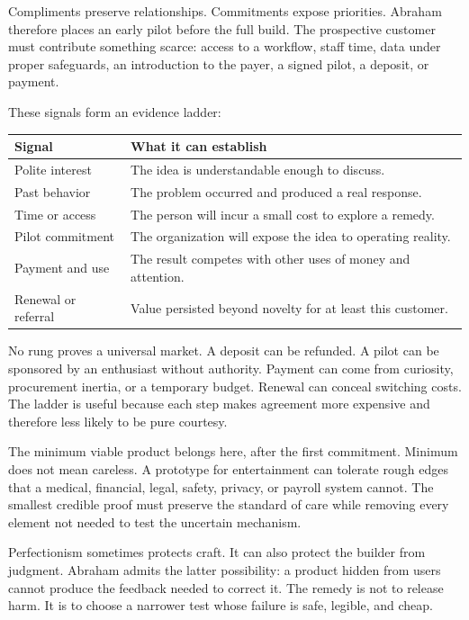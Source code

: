 Compliments preserve relationships. Commitments expose priorities. Abraham
therefore places an early pilot before the full build. The prospective customer
must contribute something scarce: access to a workflow, staff time, data under
proper safeguards, an introduction to the payer, a signed pilot, a deposit, or
payment.

These signals form an evidence ladder:

\begin{center}
\begin{tabular}{@{}p{}p{}@{}}
\toprule
\textbf{Signal} & \textbf{What it can establish} \\
\midrule
Polite interest & The idea is understandable enough to discuss. \\
Past behavior & The problem occurred and produced a real response. \\
Time or access & The person will incur a small cost to explore a remedy. \\
Pilot commitment & The organization will expose the idea to operating reality. \\
Payment and use & The result competes with other uses of money and attention. \\
Renewal or referral & Value persisted beyond novelty for at least this customer. \\
\bottomrule
\end{tabular}
\end{center}

No rung proves a universal market. A deposit can be refunded. A pilot can be
sponsored by an enthusiast without authority. Payment can come from curiosity,
procurement inertia, or a temporary budget. Renewal can conceal switching
costs. The ladder is useful because each step makes agreement more expensive
and therefore less likely to be pure courtesy.

The minimum viable product belongs here, after the first commitment. Minimum
does not mean careless. A prototype for entertainment can tolerate rough
edges that a medical, financial, legal, safety, privacy, or payroll system
cannot. The smallest credible proof must preserve the standard of care while
removing every element not needed to test the uncertain mechanism.

Perfectionism sometimes protects craft. It can also protect the builder from
judgment. Abraham admits the latter possibility: a product hidden from users
cannot produce the feedback needed to correct it. The remedy is not to release
harm. It is to choose a narrower test whose failure is safe, legible, and cheap.

